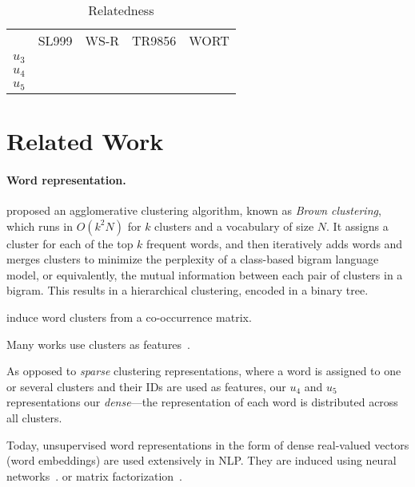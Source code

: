 \documentclass{article}
\begin{document}
    \begin{table}
        \begin{tabular}{l|cccc}
            & SL999 & WS-R & TR9856 & WORT \\
            $u_3$ \\
            $u_4$ \\
            $u_5$
        \end{tabular}
        \caption{Relatedness}\label{tab:results_rel}
    \end{table}


    \section{Related Work}\label{sec:related_work}

    \paragraph{Word representation.}
    \citet{brown1992class} proposed an agglomerative clustering algorithm,
    known as \textit{Brown clustering},
    which runs in $O(k^2N)$ for $k$ clusters and a vocabulary of size $N$.
    It assigns a cluster for each of the top $k$ frequent words,
    and then iteratively adds words and merges clusters to minimize the
    perplexity of a class-based bigram language model,
    or equivalently, the mutual information between each pair of clusters in a bigram.
    This results in a hierarchical clustering, encoded in a binary tree.

    \citet{pereira1993distributional} induce word clusters from a co-occurrence matrix.

    Many works use clusters as features~\cite{miller2004name,koo2008simple,huang2009distributional,zhao2009multilingual}.
    
    As opposed to \textit{sparse} clustering representations, where a word is assigned
    to one or several clusters and their IDs are used as features,
    our $u_4$ and $u_5$ representations our \textit{dense}---the representation of each
    word is distributed across all clusters.

    Today, unsupervised word representations in the form of dense real-valued vectors
    (word embeddings) are used extensively in NLP.
    They are induced using neural networks~\cite{bengio2003neural,mnih2007three,collobert2008unified,turian2010word,mikolov2013efficient}.
    or matrix factorization~\cite{pennington2014glove}.
    
\end{document}
